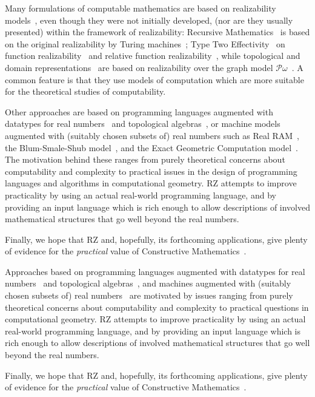 Many formulations of computable mathematics are based on realizability
models~\cite{Bauer:00}, even though they were not initially developed,
(nor are they usually presented) within the framework of realizability:
Recursive Mathematics~\cite{ershov98:_handb_recur_mathem} is based on
the original realizability by Turing machines~\cite{KleeneSC:intint};
Type Two Effectivity~\cite{Wei00} on function
realizability~\cite{KleeneSC:fouim} and relative function
realizability~\cite{BirkedalL:devttc}, while topological and domain
representations~\cite{Bla97a,Bauer:Birkedal:Scott:98} are based on
realizability over the graph model
$\mathcal{P}\omega$~\cite{ScottD:dattl}. A common feature is
that they use models of computation which are more suitable for the
theoretical studies of computability. 

\iflong
Other approaches are based on programming languages augmented with
datatypes for real numbers~\cite{escardo97:_pcf,marcial-romero04:_seman}
and topological algebras~\cite{TZ98}, or machine models augmented with
(suitably chosen subsets of) real numbers such as Real
RAM~\cite{borodin75}, the Blum-Smale-Shub
model~\cite{blum98:_compl_real_comput}, and the Exact Geometric
Computation model~\cite{yap06:_theor_real_comput_egc}. The motivation
behind these ranges from purely theoretical concerns about
computability and complexity to practical issues in the design of
programming languages and algorithms in computational geometry. RZ
attempts to improve practicality by using an actual
real-world programming language, and by providing an input language
which is rich enough to allow descriptions of involved mathematical
structures that go well beyond the real numbers.

Finally, we hope that RZ and, hopefully, its forthcoming applications,
give plenty of evidence for the \emph{practical} value of Constructive
Mathematics~\cite{Bishop:Bridges:85}.

\else %

Approaches based on programming languages augmented with datatypes for
real numbers~\cite{escardo97:_pcf,marcial-romero04:_seman} and topological
algebras~\cite{TZ98}, and machines augmented with (suitably chosen
subsets of) real
numbers~\cite{borodin75,blum98:_compl_real_comput,yap06:_theor_real_comput_egc}
are motivated by issues ranging from purely theoretical concerns about
computability and complexity to practical questions in computational
geometry. RZ attempts to improve practicality by using an actual
real-world programming language, and by providing an input language
which is rich enough to allow descriptions of involved mathematical
structures that go well beyond the real numbers.

Finally, we hope that RZ and, hopefully, its forthcoming applications,
give plenty of evidence for the \emph{practical} value of Constructive
Mathematics~\cite{Bishop:Bridges:85}.

\fi



